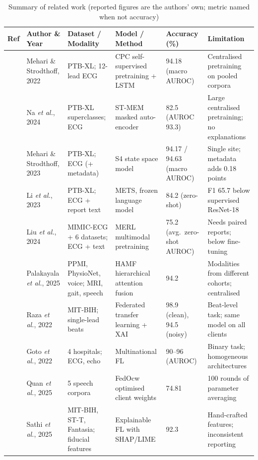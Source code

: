 \begin{table}[!t]
\centering
\caption{Summary of related work (reported figures are the authors' own; metric named when not accuracy)}
\label{tab:related}
\footnotesize
\setlength{\tabcolsep}{4pt}
\begin{tabular}{@{}p{0.6cm}p{2.4cm}p{3.1cm}p{3.6cm}p{2.0cm}p{4.8cm}@{}}
\toprule
Ref & Author \& Year & Dataset / Modality & Model / Method & Accuracy (\%) & Limitation \\
\midrule
\cite{mehari2022ssl} & Mehari \& Strodthoff, 2022 & PTB-XL; 12-lead ECG & CPC self-supervised pretraining + LSTM & 94.18 (macro AUROC) & Centralised pretraining on pooled corpora \\
\cite{na2024stmem} & Na \textit{et al.}, 2024 & PTB-XL superclasses; ECG & ST-MEM masked auto-encoder & 82.5 (AUROC 93.3) & Large centralised pretraining; no explanations \\
\cite{mehari2023s4} & Mehari \& Strodthoff, 2023 & PTB-XL; ECG (+ metadata) & S4 state space model & 94.17 / 94.63 (macro AUROC) & Single site; metadata adds 0.18 points \\
\cite{li2023mets} & Li \textit{et al.}, 2023 & PTB-XL; ECG + report text & METS, frozen language model & 84.2 (zero-shot) & F1 65.7 below supervised ResNet-18 \\
\cite{liu2024merl} & Liu \textit{et al.}, 2024 & MIMIC-ECG + 6 datasets; ECG + text & MERL multimodal pretraining & 75.2 (avg.\ zero-shot AUROC) & Needs paired reports; below fine-tuning \\
\cite{palakayala2025hamf} & Palakayala \textit{et al.}, 2025 & PPMI, PhysioNet, voice; MRI, gait, speech & HAMF hierarchical attention fusion & 94.2 & Modalities from different cohorts; centralised \\
\cite{raza2022fed} & Raza \textit{et al.}, 2022 & MIT-BIH; single-lead beats & Federated transfer learning + XAI & 98.9 (clean), 94.5 (noisy) & Beat-level task; same model on all clients \\
\cite{goto2022fed} & Goto \textit{et al.}, 2022 & 4 hospitals; ECG, echo & Multinational FL & 90--96 (AUROC) & Binary task; homogeneous architectures \\
\cite{quan2025fedocw} & Quan \textit{et al.}, 2025 & 5 speech corpora & FedOcw optimised client weights & 74.81 & 100 rounds of parameter averaging \\
\cite{sathi2025xfl} & Sathi \textit{et al.}, 2025 & MIT-BIH, ST-T, Fantasia; fiducial features & Explainable FL with SHAP/LIME & 92.3 & Hand-crafted features; inconsistent reporting \\

\end{tabular}
\end{table}
